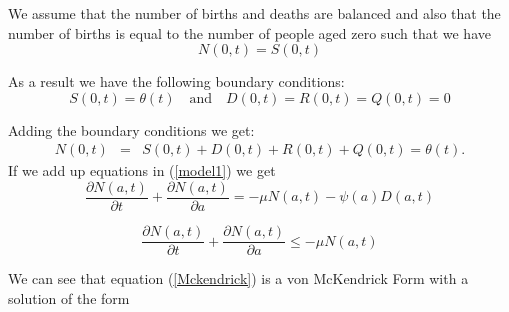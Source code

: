 We assume that the number of births and deaths are balanced and also that the number of births is equal to the number of people aged zero such that we have 
\begin{equation}
N(0,t)= S(0,t)
\end{equation}
 
As a result we have the following boundary conditions:
\begin{equation}
S(0,t)= \theta(t) \quad \text{and} \quad D(0,t)=R(0,t)=Q(0,t)=0
\end{equation}

Adding the boundary conditions we get:
\begin{eqnarray}
N(0,t)&=& S(0,t)+D(0,t)+R(0,t)+Q(0,t)
       = \theta(t).
\end{eqnarray}
If we add up equations in (\ref{model1})
we get 
\begin{equation}
\frac{\partial N(a,t)}{\partial t}+ \frac{\partial N(a,t)}{\partial a}=-\mu N(a,t)-\psi(a) D (a,t)
\end{equation}

\begin{equation}\label{Mckendrick}
\frac{\partial N(a,t)}{\partial t}+ \frac{\partial N(a,t)}{\partial a} \leq-\mu N(a,t)
\end{equation}

We can see that equation (\ref{Mckendrick}) is a von McKendrick Form with a solution of the form

